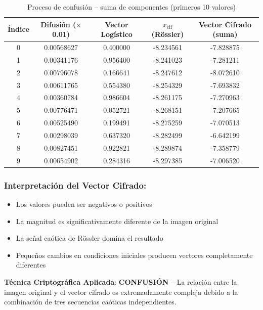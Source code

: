 \documentclass[12pt,a4paper]{article}
\begin{document}
\begin{table}[H]
\centering
\caption{Proceso de confusión -- suma de componentes (primeros 10 valores)}
\label{tab:confusion}
\small
\begin{tabular}{@{}ccccc@{}}
\toprule
\textbf{Índice} & \textbf{Difusión ($\times$0.01)} & \textbf{Vector Logístico} & \textbf{$x_{\text{cif}}$ (Rössler)} & \textbf{Vector Cifrado (suma)} \\ \midrule
0 & 0.00568627 & 0.400000 & -8.234561 & -7.828875 \\
1 & 0.00341176 & 0.956400 & -8.241023 & -7.281211 \\
2 & 0.00796078 & 0.166641 & -8.247612 & -8.072610 \\
3 & 0.00611765 & 0.554380 & -8.254329 & -7.693832 \\
4 & 0.00360784 & 0.986604 & -8.261175 & -7.270963 \\
5 & 0.00776471 & 0.052721 & -8.268151 & -7.207665 \\
6 & 0.00525490 & 0.199491 & -8.275259 & -7.070513 \\
7 & 0.00298039 & 0.637320 & -8.282499 & -6.642199 \\
8 & 0.00827451 & 0.922821 & -8.289874 & -7.358779 \\
9 & 0.00654902 & 0.284316 & -8.297385 & -7.006520 \\ \bottomrule
\end{tabular}
\end{table}

\subsubsection*{Interpretación del Vector Cifrado:}
\begin{itemize}
    \item Los valores pueden ser negativos o positivos
    \item La magnitud es significativamente diferente de la imagen original
    \item La señal caótica de Rössler domina el resultado
    \item Pequeños cambios en condiciones iniciales producen vectores completamente diferentes
\end{itemize}

\textbf{Técnica Criptográfica Aplicada}: \textbf{CONFUSIÓN} -- La relación entre la imagen original y el vector cifrado es extremadamente compleja debido a la combinación de tres secuencias caóticas independientes.
\end{document}
